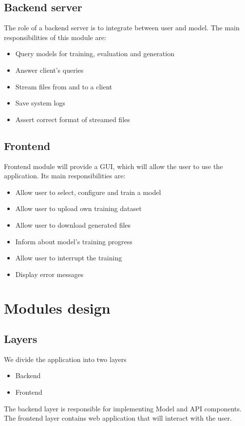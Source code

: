 \documentclass{article}
\begin{document}
\subsection{Backend server}
The role of a backend server is to integrate between user and model. The main responsibilities of this module are:
\begin{itemize}
    \item Query models for training, evaluation and generation
    \item Answer client's queries
    \item Stream files from and to a client
    \item Save system logs
    \item Assert correct format of streamed files
\end{itemize}

\subsection{Frontend}
Frontend module will provide a GUI, which will allow the user to use the application. Its main responsibilities are:
\begin{itemize}
    \item Allow user to select, configure and train a model
    \item Allow user to upload own training dataset
    \item Allow user to download generated files
    \item Inform about model's training progress
    \item Allow user to interrupt the training
    \item Display error messages
\end{itemize}

\section{Modules design}
\subsection{Layers}
We divide the application into two layers
\begin{itemize}
    \item Backend
    \item Frontend
\end{itemize}
The backend layer is responsible for implementing Model and API components. The frontend layer contains web application that will interact with the user.
\end{document}
